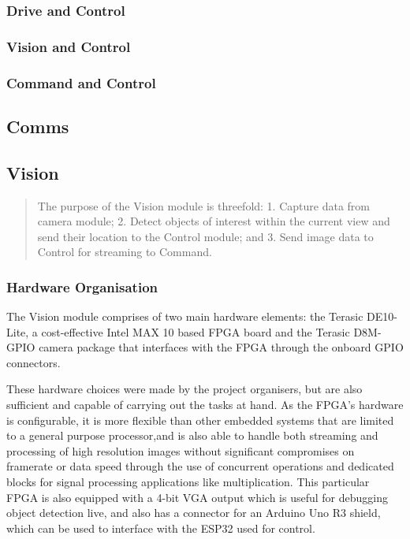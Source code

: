 \documentclass[a4paper]{article}
\begin{document}
\subsubsection{Drive and Control}

\subsubsection{Vision and Control}

\subsubsection{Command and Control}

\subsection{Comms}

\subsection{Vision}
\begin{abstract}
    The purpose of the Vision module is threefold:
    1. Capture data from camera module;
    2. Detect objects of interest within the current view and 
        send their location to the Control module; and
    3. Send image data to Control for streaming to Command. 
\end{abstract}

\subsubsection{Hardware Organisation}

The Vision module comprises of two main hardware elements: 
    the Terasic DE10-Lite, a cost-effective Intel MAX 10 based FPGA board 
    \cite{TerasicDE10Web} 
    and the Terasic D8M-GPIO camera package \cite{TerasicD8MWeb}
that interfaces with the FPGA through the onboard GPIO connectors. 

These hardware choices were made by the project organisers, 
but are also sufficient and capable of carrying out the tasks at hand. 
As the FPGA's hardware is configurable, 
it is more flexible than other embedded systems 
that are limited to a general purpose processor,and 
is also able to handle both streaming and processing of high resolution images
without significant compromises on framerate or data speed 
through the use of concurrent operations and dedicated blocks 
for signal processing applications like multiplication.
This particular FPGA is also equipped with a 4-bit VGA output 
which is useful for debugging object detection live, 
and also has a connector for an Arduino Uno R3 shield, \cite{TerasicDE10Web} 
which can be used to interface with the ESP32 used for control.  
\end{document}
